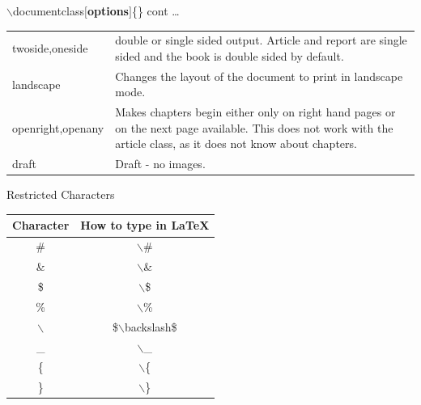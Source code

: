 \documentclass[10pt,xcolor=table]{beamer}
\begin{document}

\begin{frame}{$\backslash$documentclass$[$\textbf{options}$]$\{\} cont \dots}
\begin{table}
\begin{tabular}{|p{}|p{}|}
twoside,\newline  oneside & double or single sided output. Article and report are single sided and the book is double sided by default. \\
landscape & Changes the layout of the document to print in landscape mode. \\
openright,\newline  openany & Makes chapters begin either only on right hand pages or on the next page available. This does not work with the article class, as it does not know about chapters. \\
draft & Draft - no images. \\
\end{tabular}
\end{table}
\end{frame}




\begin{frame}{Restricted Characters}
\begin{table}
\begin{tabular}{cc}
\hline
\textbf{Character} & \textbf{How to type in LaTeX} \\  \hline
\# & $\backslash$\# \\ 
\& & $\backslash$\& \\ 
\$ & $\backslash$\$ \\
\% & $\backslash$\% \\ 
$\backslash$ & \$$\backslash$backslash\$ \\ 
\_ & $\backslash$\_ \\
\{ & $\backslash$\{ \\
\} & $\backslash$\} \\

\end{tabular}
\end{table}
\end{frame}
\end{document}
